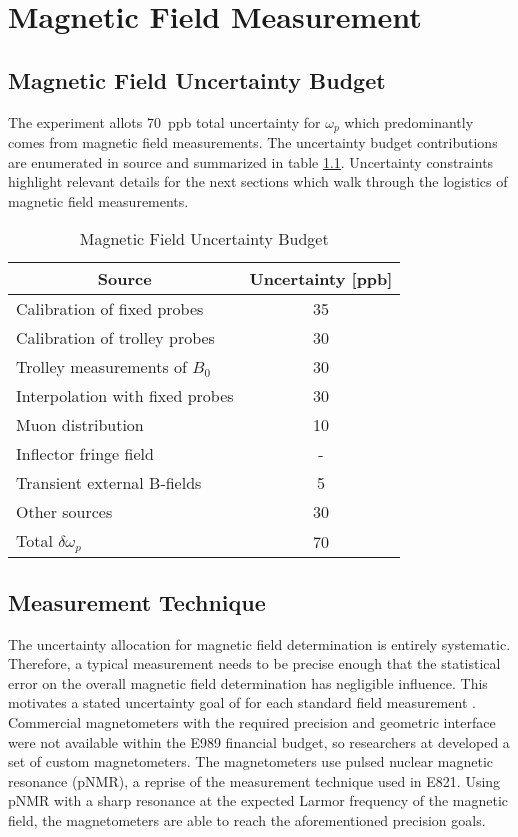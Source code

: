 \chapter{Magnetic Field Measurement} \label{ch:field}

\section{Magnetic Field Uncertainty Budget}

The \mugmtwo experiment allots \SI{70}{ppb} total uncertainty for $\omega_p$ which predominantly comes from magnetic field measurements.  The uncertainty budget contributions are enumerated in source \cite{e989-tdr} and summarized in table \ref{tab:field-uncertainties}.  Uncertainty constraints highlight relevant details for the next sections which walk through the logistics of magnetic field measurements.

\begin{table}[h]
\label{tab:field-uncertainties}
\caption{Magnetic Field Uncertainty Budget}
\centering
\begin{tabular}{l c}
    \hline
    \multicolumn{1}{c}{Source} & Uncertainty [ppb] \\
    \hline
    Calibration of fixed probes      & 35 \\
    Calibration of trolley probes    & 30 \\
    Trolley measurements of $B_0$    & 30 \\
    Interpolation with fixed probes  & 30 \\
    Muon distribution                & 10 \\
    Inflector fringe field           & -  \\
    Transient external B-fields      & 5  \\
    Other sources                    & 30 \\
    \hline
    Total $\delta \omega_p$          & 70 \\
    \hline
\end{tabular}
\end{table}

\section{Measurement Technique} \label{sec:field-measurement-technique}

The uncertainty allocation for magnetic field determination is entirely systematic.  Therefore, a typical measurement needs to be precise enough that the statistical error on the overall magnetic field determination has negligible influence.  This motivates a stated uncertainty goal of  for each standard field measurement \cite{e989-tdr}.  Commercial magnetometers with the required precision and geometric interface were not available within the E989 financial budget, so researchers at \uw developed a set of custom magnetometers. The magnetometers use pulsed nuclear magnetic resonance (pNMR), a reprise of the measurement technique used in E821.  Using pNMR with a sharp resonance at the expected Larmor frequency of the \gmtwo magnetic field, the magnetometers are able to reach the aforementioned precision goals.

